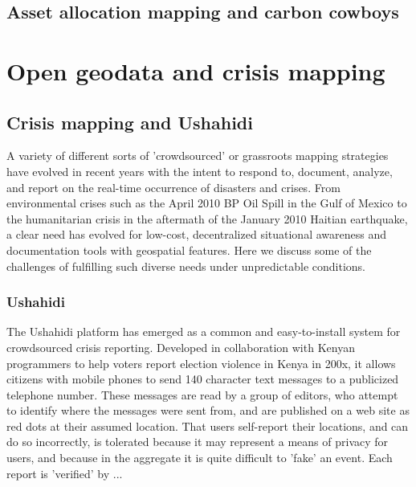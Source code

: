 \documentclass[11pt]{report}
\begin{document}
\subsection{Asset allocation mapping and carbon cowboys}

\cite{poole2006there}


\section{Open geodata and crisis mapping}
\subsection{Crisis mapping and Ushahidi}

A variety of different sorts of 'crowdsourced' or grassroots mapping strategies have evolved in recent years with the intent to respond to, document, analyze, and report on the real-time occurrence of disasters and crises. From environmental crises such as the April 2010 BP Oil Spill in the Gulf of Mexico to the humanitarian crisis in the aftermath of the January 2010 Haitian earthquake, a clear need has evolved for low-cost, decentralized situational awareness and documentation tools with geospatial features. Here we discuss some of the challenges of fulfilling such diverse needs under unpredictable conditions.

\subsubsection{Ushahidi}

The Ushahidi platform has emerged as a common and easy-to-install system for crowdsourced crisis reporting. Developed in collaboration with Kenyan programmers to help voters report election violence in Kenya in 200x, it allows citizens with mobile phones to send 140 character text messages to a publicized telephone number.\cite{okolloh2009ushahidi} These messages are read by a group of editors, who attempt to identify where the messages were sent from, and are published on a web site as red dots at their assumed location. That users self-report their locations, and can do so incorrectly, is tolerated because it may represent a means of privacy for users, and because in the aggregate it is quite difficult to 'fake' an event. Each report is 'verified' by ... 
\end{document}
